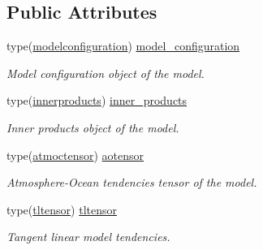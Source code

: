 \subsection*{Public Attributes}
\begin{DoxyCompactItemize}
\item 
\mbox{\label{structmodel__def_1_1model_a51357fc425ffbcac7379506674ab160a}} 
type(\hyperlink{structparams_1_1modelconfiguration}{modelconfiguration}) \hyperlink{structmodel__def_1_1model_a51357fc425ffbcac7379506674ab160a}{model\+\_\+configuration}
\begin{DoxyCompactList}\small\item\em Model configuration object of the model. \end{DoxyCompactList}\item 
\mbox{\label{structmodel__def_1_1model_adf914bba30b77b03601cfb3e7415a272}} 
type(\hyperlink{structinprod__analytic_1_1innerproducts}{innerproducts}) \hyperlink{structmodel__def_1_1model_adf914bba30b77b03601cfb3e7415a272}{inner\+\_\+products}
\begin{DoxyCompactList}\small\item\em Inner products object of the model. \end{DoxyCompactList}\item 
\mbox{\label{structmodel__def_1_1model_aafe9a0c31d2c25378a9e08a3dab66ba5}} 
type(\hyperlink{structaotensor__def_1_1atmoctensor}{atmoctensor}) \hyperlink{structmodel__def_1_1model_aafe9a0c31d2c25378a9e08a3dab66ba5}{aotensor}
\begin{DoxyCompactList}\small\item\em Atmosphere-\/\+Ocean tendencies tensor of the model. \end{DoxyCompactList}\item 
\mbox{\label{structmodel__def_1_1model_ad1aef0b2a70dd7921c07d8d929513c23}} 
type(\hyperlink{structtl__ad__tensor_1_1tltensor}{tltensor}) \hyperlink{structmodel__def_1_1model_ad1aef0b2a70dd7921c07d8d929513c23}{tltensor}
\begin{DoxyCompactList}\small\item\em Tangent linear model tendencies. \end{DoxyCompactList}\item 
\mbox{\label{structmodel__def_1_1model_a5fd98607a716156493328f547110c4fb}} 

\end{DoxyCompactItemize}
